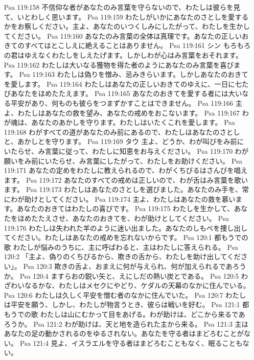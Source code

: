 Psa 119:158  不信仰な者があなたのみ言葉を守らないので、わたしは彼らを見て、いとわしく思います。
Psa 119:159  わたしがいかにあなたのさとしを愛するかをお察しください。主よ、あなたのいつくしみにしたがって、わたしを生かしてください。
Psa 119:160  あなたのみ言葉の全体は真理です。あなたの正しいおきてのすべてはとこしえに絶えることはありません。
Psa 119:161  シン もろもろの君はゆえなくわたしをしえたげます。しかしわが心はみ言葉をおそれます。
Psa 119:162  わたしは大いなる獲物を得た者のようにあなたのみ言葉を喜びます。
Psa 119:163  わたしは偽りを憎み、忌みきらいます。しかしあなたのおきてを愛します。
Psa 119:164  わたしはあなたの正しいおきてのゆえに、一日に七たびあなたをほめたたえます。
Psa 119:165  あなたのおきてを愛する者には大いなる平安があり、何ものも彼らをつまずかすことはできません。
Psa 119:166  主よ、わたしはあなたの救を望み、あなたの戒めをおこないます。
Psa 119:167  わが魂は、あなたのあかしを守ります。わたしはいたくこれを愛します。
Psa 119:168  わがすべての道があなたのみ前にあるので、わたしはあなたのさとしと、あかしとを守ります。
Psa 119:169  タウ 主よ、どうか、わが叫びをみ前にいたらせ、み言葉に従って、わたしに知恵をお与えください。
Psa 119:170  わが願いをみ前にいたらせ、み言葉にしたがって、わたしをお助けください。
Psa 119:171  あなたの定めをわたしに教えられるので、わがくちびるはさんびを唱えます。
Psa 119:172  あなたのすべての戒めは正しいので、わが舌はみ言葉を歌います。
Psa 119:173  わたしはあなたのさとしを選びました。あなたのみ手を、常にわが助けとしてください。
Psa 119:174  主よ、わたしはあなたの救を慕います。あなたのおきてはわたしの喜びです。
Psa 119:175  わたしを生かして、あなたをほめたたえさせ、あなたのおきてを、わが助けとしてください。
Psa 119:176  わたしは失われた羊のように迷い出ました。あなたのしもべを捜し出してください。わたしはあなたの戒めを忘れないからです。
Psa 120:1  都もうでの歌 わたしが悩みのうちに、主に呼ばわると、主はわたしに答えられる。
Psa 120:2  「主よ、偽りのくちびるから、欺きの舌から、わたしを助け出してください」。
Psa 120:3  欺きの舌よ、おまえに何が与えられ、何が加えられるであろうか。
Psa 120:4  ますらおの鋭い矢と、えにしだの熱い炭とである。
Psa 120:5  わざわいなるかな、わたしはメセクにやどり、ケダルの天幕のなかに住んでいる。
Psa 120:6  わたしは久しく平安を憎む者のなかに住んでいた。
Psa 120:7  わたしは平安を願う、しかし、わたしが物言うとき、彼らは戦いを好む。
Psa 121:1  都もうでの歌 わたしは山にむかって目をあげる。わが助けは、どこから来るであろうか。
Psa 121:2  わが助けは、天と地を造られた主から来る。
Psa 121:3  主はあなたの足の動かされるのをゆるされない。あなたを守る者はまどろむことがない。
Psa 121:4  見よ、イスラエルを守る者はまどろむこともなく、眠ることもない。
